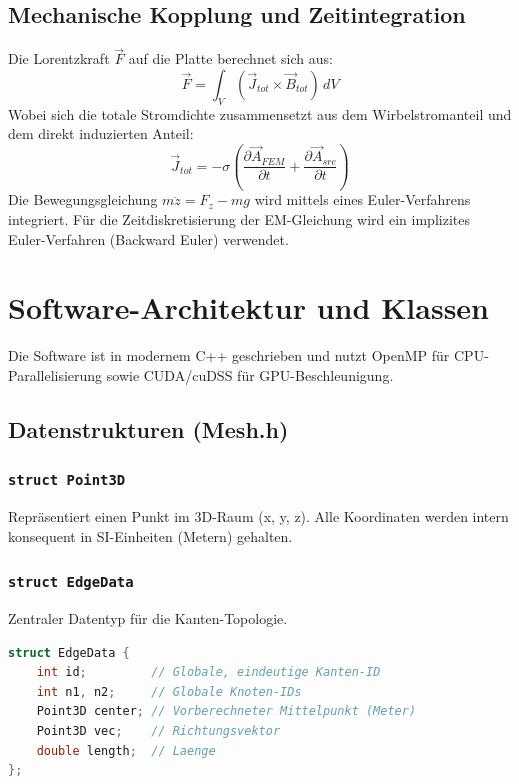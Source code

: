 \documentclass[a4paper,12pt]{article}
\begin{document}
\subsection{Mechanische Kopplung und Zeitintegration}
Die Lorentzkraft $\vec{F}$ auf die Platte berechnet sich aus:
\begin{equation}
    \vec{F} = \int_{V} (\vec{J}_{tot} \times \vec{B}_{tot}) \, dV
\end{equation}
Wobei sich die totale Stromdichte zusammensetzt aus dem Wirbelstromanteil und dem direkt induzierten Anteil:
\begin{equation}
    \vec{J}_{tot} = -\sigma \left( \frac{\partial \vec{A}_{FEM}}{\partial t} + \frac{\partial \vec{A}_{src}}{\partial t} \right)
\end{equation}
Die Bewegungsgleichung $m\ddot{z} = F_z - mg$ wird mittels eines Euler-Verfahrens integriert. Für die Zeitdiskretisierung der EM-Gleichung wird ein implizites Euler-Verfahren (Backward Euler) verwendet.

\section{Software-Architektur und Klassen}

Die Software ist in modernem C++ geschrieben und nutzt OpenMP für CPU-Parallelisierung sowie CUDA/cuDSS für GPU-Beschleunigung.

\subsection{Datenstrukturen (Mesh.h)}

\subsubsection{\texttt{struct Point3D}}
Repräsentiert einen Punkt im 3D-Raum (x, y, z). Alle Koordinaten werden intern konsequent in SI-Einheiten (Metern) gehalten.

\subsubsection{\texttt{struct EdgeData}}
Zentraler Datentyp für die Kanten-Topologie.
\begin{lstlisting}[language=C++]
struct EdgeData {
    int id;         // Globale, eindeutige Kanten-ID
    int n1, n2;     // Globale Knoten-IDs
    Point3D center; // Vorberechneter Mittelpunkt (Meter)
    Point3D vec;    // Richtungsvektor
    double length;  // Laenge
};
\end{lstlisting}
\end{document}
